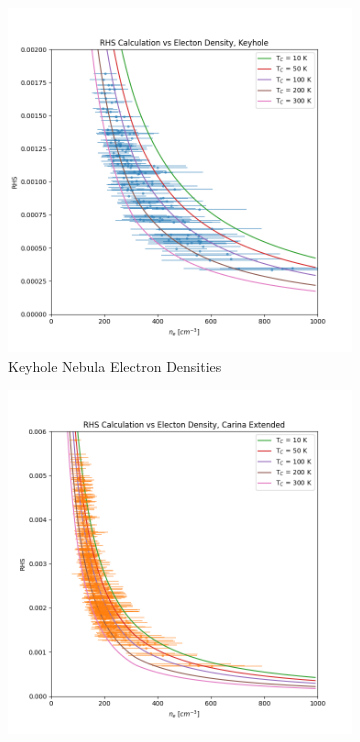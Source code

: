 \begin{figure}
    \centering
    \begin{subfigure}[t]{0.45\textwidth}
        \centering
        \includegraphics[width=\textwidth]{figs/carina/rhs_keyhole.png}
        \caption{Keyhole Nebula Electron Densities}
        \label{carina/fig:calculations_keyhole}
    \end{subfigure}
    \begin{subfigure}[t]{0.45\textwidth}
        \centering
        \includegraphics[width=\textwidth]{figs/carina/rhs_carina.png}

\end{subfigure}
\end{figure}
